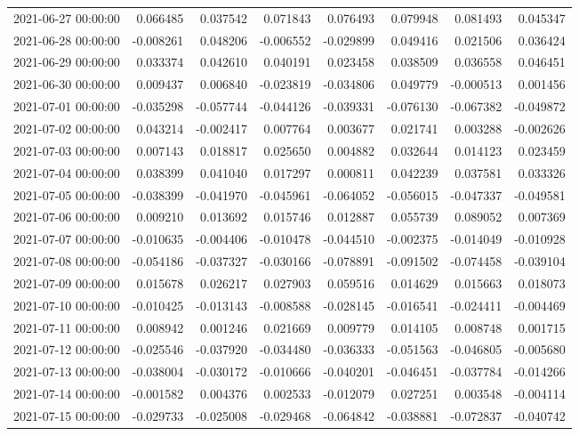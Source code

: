 \begin{tabular}{lrrrrrrr}
2021-06-27 00:00:00 & 0.066485 & 0.037542 & 0.071843 & 0.076493 & 0.079948 & 0.081493 & 0.045347 \\
2021-06-28 00:00:00 & -0.008261 & 0.048206 & -0.006552 & -0.029899 & 0.049416 & 0.021506 & 0.036424 \\
2021-06-29 00:00:00 & 0.033374 & 0.042610 & 0.040191 & 0.023458 & 0.038509 & 0.036558 & 0.046451 \\
2021-06-30 00:00:00 & 0.009437 & 0.006840 & -0.023819 & -0.034806 & 0.049779 & -0.000513 & 0.001456 \\
2021-07-01 00:00:00 & -0.035298 & -0.057744 & -0.044126 & -0.039331 & -0.076130 & -0.067382 & -0.049872 \\
2021-07-02 00:00:00 & 0.043214 & -0.002417 & 0.007764 & 0.003677 & 0.021741 & 0.003288 & -0.002626 \\
2021-07-03 00:00:00 & 0.007143 & 0.018817 & 0.025650 & 0.004882 & 0.032644 & 0.014123 & 0.023459 \\
2021-07-04 00:00:00 & 0.038399 & 0.041040 & 0.017297 & 0.000811 & 0.042239 & 0.037581 & 0.033326 \\
2021-07-05 00:00:00 & -0.038399 & -0.041970 & -0.045961 & -0.064052 & -0.056015 & -0.047337 & -0.049581 \\
2021-07-06 00:00:00 & 0.009210 & 0.013692 & 0.015746 & 0.012887 & 0.055739 & 0.089052 & 0.007369 \\
2021-07-07 00:00:00 & -0.010635 & -0.004406 & -0.010478 & -0.044510 & -0.002375 & -0.014049 & -0.010928 \\
2021-07-08 00:00:00 & -0.054186 & -0.037327 & -0.030166 & -0.078891 & -0.091502 & -0.074458 & -0.039104 \\
2021-07-09 00:00:00 & 0.015678 & 0.026217 & 0.027903 & 0.059516 & 0.014629 & 0.015663 & 0.018073 \\
2021-07-10 00:00:00 & -0.010425 & -0.013143 & -0.008588 & -0.028145 & -0.016541 & -0.024411 & -0.004469 \\
2021-07-11 00:00:00 & 0.008942 & 0.001246 & 0.021669 & 0.009779 & 0.014105 & 0.008748 & 0.001715 \\
2021-07-12 00:00:00 & -0.025546 & -0.037920 & -0.034480 & -0.036333 & -0.051563 & -0.046805 & -0.005680 \\
2021-07-13 00:00:00 & -0.038004 & -0.030172 & -0.010666 & -0.040201 & -0.046451 & -0.037784 & -0.014266 \\
2021-07-14 00:00:00 & -0.001582 & 0.004376 & 0.002533 & -0.012079 & 0.027251 & 0.003548 & -0.004114 \\
2021-07-15 00:00:00 & -0.029733 & -0.025008 & -0.029468 & -0.064842 & -0.038881 & -0.072837 & -0.040742 \\

\end{tabular}
